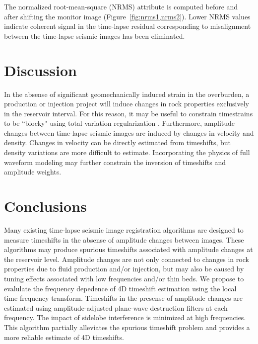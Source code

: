 
The normalized root-mean-square (NRMS) attribute is computed before and after shifting the monitor image (Figure~\ref{fig:nrms1,nrms2}).
Lower NRMS values indicate coherent signal in the time-lapse residual corresponding to misalignment between the time-lapse seismic images has been eliminated.


\section{Discussion}
In the absense of significant geomechanically induced strain in the overburden, a production or injection project will induce changes in rock properties exclusively in the reservoir interval.
For this reason, it may be useful to constrain timestrains to be ``blocky" using total variation regularization \cite[]{rudin,steidl}.
Furthermore, amplitude changes between time-lapse seismic images are induced by changes in velocity and density.
Changes in velocity can be directly estimated from timeshifts, but density variations are more difficult to estimate.
Incorporating the physics of full waveform modeling \cite[]{virieux} may further constrain the inversion of timeshifts and amplitude weights. 

\section{Conclusions}
Many existing time-lapse seismic image registration algorithms are designed to measure timeshifts in the absense of amplitude changes between images.
These algorithms may produce spurious timeshifts associated with amplitude changes at the reservoir level.
Amplitude changes are not only connected to changes in rock properties due to fluid production and/or injection, but may also be caused by tuning effects associated with low frequencies and/or thin beds.
We propose to evalulate the frequency depedence of 4D timeshift estimation using the local time-frequency transform.
Timeshifts in the presense of amplitude changes are estimated using amplitude-adjusted plane-wave destruction filters at each frequency.
The impact of sidelobe interference is minimized at high frequencies.
This algorithm partially alleviates the spurious timeshift problem and provides a more reliable estimate of 4D timeshifts.

